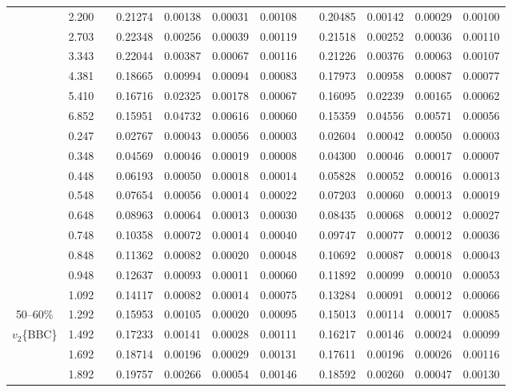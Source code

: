 \documentclass[aps,prc,superscriptaddress,showpacs,floatfix,twocolumn]{revtex4}
\begin{document}
\begin{table}[htbp]
\begin{ruledtabular}
\begin{tabular}{c|ccccccccccc}
 & 2.200 && 0.21274 & 0.00138 & 0.00031 & 0.00108 & & 0.20485 & 0.00142 & 0.00029 & 0.00100 \\ 
 & 2.703 && 0.22348 & 0.00256 & 0.00039 & 0.00119 & & 0.21518 & 0.00252 & 0.00036 & 0.00110 \\ 
 & 3.343 && 0.22044 & 0.00387 & 0.00067 & 0.00116 & & 0.21226 & 0.00376 & 0.00063 & 0.00107 \\ 
 & 4.381 && 0.18665 & 0.00994 & 0.00094 & 0.00083 & & 0.17973 & 0.00958 & 0.00087 & 0.00077 \\ 
 & 5.410 && 0.16716 & 0.02325 & 0.00178 & 0.00067 & & 0.16095 & 0.02239 & 0.00165 & 0.00062 \\ 
 & 6.852 && 0.15951 & 0.04732 & 0.00616 & 0.00060 & & 0.15359 & 0.04556 & 0.00571 & 0.00056 \\ 
\hline 
 & 0.247 && 0.02767 & 0.00043 & 0.00056 & 0.00003 & & 0.02604 & 0.00042 & 0.00050 & 0.00003 \\ 
 & 0.348 && 0.04569 & 0.00046 & 0.00019 & 0.00008 & & 0.04300 & 0.00046 & 0.00017 & 0.00007 \\ 
 & 0.448 && 0.06193 & 0.00050 & 0.00018 & 0.00014 & & 0.05828 & 0.00052 & 0.00016 & 0.00013 \\ 
 & 0.548 && 0.07654 & 0.00056 & 0.00014 & 0.00022 & & 0.07203 & 0.00060 & 0.00013 & 0.00019 \\ 
 & 0.648 && 0.08963 & 0.00064 & 0.00013 & 0.00030 & & 0.08435 & 0.00068 & 0.00012 & 0.00027 \\ 
 & 0.748 && 0.10358 & 0.00072 & 0.00014 & 0.00040 & & 0.09747 & 0.00077 & 0.00012 & 0.00036 \\ 
 & 0.848 && 0.11362 & 0.00082 & 0.00020 & 0.00048 & & 0.10692 & 0.00087 & 0.00018 & 0.00043 \\ 
 & 0.948 && 0.12637 & 0.00093 & 0.00011 & 0.00060 & & 0.11892 & 0.00099 & 0.00010 & 0.00053 \\ 
 & 1.092 && 0.14117 & 0.00082 & 0.00014 & 0.00075 & & 0.13284 & 0.00091 & 0.00012 & 0.00066 \\ 
50--60\%
 & 1.292 && 0.15953 & 0.00105 & 0.00020 & 0.00095 & & 0.15013 & 0.00114 & 0.00017 & 0.00085 \\ 
$v_2$\{BBC\}
 & 1.492 && 0.17233 & 0.00141 & 0.00028 & 0.00111 & & 0.16217 & 0.00146 & 0.00024 & 0.00099 \\ 
 & 1.692 && 0.18714 & 0.00196 & 0.00029 & 0.00131 & & 0.17611 & 0.00196 & 0.00026 & 0.00116 \\ 
 & 1.892 && 0.19757 & 0.00266 & 0.00054 & 0.00146 & & 0.18592 & 0.00260 & 0.00047 & 0.00130 \\ 

\end{tabular}
\end{ruledtabular}
\end{table}
\end{document}
